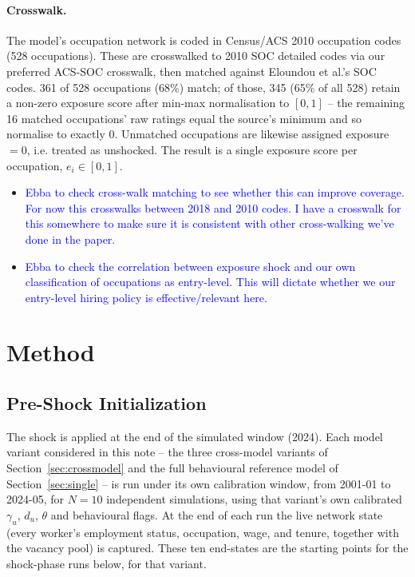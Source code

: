 \documentclass{article}
\begin{document}
\paragraph{Crosswalk.} The model's occupation network is coded in Census/ACS 2010
occupation codes (528 occupations). These are crosswalked to 2010 SOC detailed codes via
our preferred ACS-SOC crosswalk, then matched against
Eloundou et al.'s SOC codes. 361 of 528 occupations (68\%) match; of those, 345 (65\% of
all 528) retain a non-zero exposure score after min-max normalisation to $[0,1]$ -- the remaining 16
matched occupations' raw ratings equal the source's minimum and so normalise to exactly 0. Unmatched
occupations are
likewise assigned exposure $=0$, i.e. treated as unshocked. The result is a single exposure score per
occupation, $e_i \in [0,1]$.\label{par:crosswalk}

\begin{itemize}
\item \textcolor{blue}{Ebba to check cross-walk matching to see whether this can improve coverage. For now this crosswalks between 2018 and 2010 codes. I have a crosswalk for this somewhere to make sure it is consistent with other cross-walking we've done in the paper.}
\item \textcolor{blue}{Ebba to check the correlation between exposure shock and our own classification of occupations as entry-level. This will dictate whether we our entry-level hiring policy is effective/relevant here.}
\end{itemize}


\section{Method}

\subsection{Pre-Shock Initialization}
\label{sec:warmstart}

The shock is applied at the end of the simulated window (2024). Each model variant considered in this
note -- the three cross-model variants of Section~\ref{sec:crossmodel} and the full behavioural
reference model of Section~\ref{sec:single} -- is run under its own calibration window, from 2001-01
to 2024-05, for $N=10$ independent simulations, using that variant's own calibrated $\gamma_u$, $d_u$,
$\theta$ and behavioural flags. At the end of each run the live network state (every worker's
employment status, occupation, wage, and tenure, together with the vacancy pool) is captured. These
ten end-states are the starting points for the shock-phase runs below, for that variant.
\end{document}
